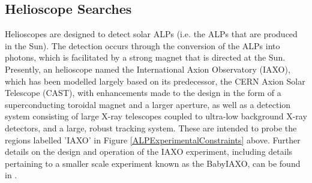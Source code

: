 \subsection{Helioscope Searches}
Helioscopes are designed to detect solar ALPs (i.e. the ALPs that are produced in the Sun). The detection occurs through the conversion of the ALPs into photons, which is facilitated by a strong magnet that is directed at the Sun.
Presently, an helioscope named the International Axion Observatory (IAXO), which has been modelled largely based on its predecessor, the CERN Axion Solar Telescope (CAST), with enhancements made to the design in the form of a superconducting
toroidal magnet and a larger aperture, as well as a detection system consisting of large X-ray telescopes coupled to ultra-low background X-ray detectors, and a large, robust tracking system. These are intended to probe the regions labelled 'IAXO'
in Figure \ref{ALPExperimentalConstraints} above. Further details on the design and operation of the IAXO experiment, including details pertaining to a smaller scale experiment known as the BabyIAXO, can be found in \cite{MargalejoBlasco:2022ncg}.
